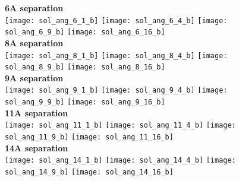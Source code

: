 \documentclass[journal=acsnano,manuscript=article]{achemso}
\begin{document}
\begin{figure}[h!]
	\centering
	\textbf{6A separation} \\
	\texttt{[image: sol\_ang\_6\_1\_b]}
	\texttt{[image: sol\_ang\_6\_4\_b]}
	\texttt{[image: sol\_ang\_6\_9\_b]}
	\texttt{[image: sol\_ang\_6\_16\_b]}
	\\ \textbf{8A separation} \\
	\texttt{[image: sol\_ang\_8\_1\_b]}
	\texttt{[image: sol\_ang\_8\_4\_b]}
	\texttt{[image: sol\_ang\_8\_9\_b]}
	\texttt{[image: sol\_ang\_8\_16\_b]}
	\\ \textbf{9A separation} \\
	\texttt{[image: sol\_ang\_9\_1\_b]}
	\texttt{[image: sol\_ang\_9\_4\_b]}
	\texttt{[image: sol\_ang\_9\_9\_b]}
	\texttt{[image: sol\_ang\_9\_16\_b]}
	\\ \textbf{11A separation} \\
	\texttt{[image: sol\_ang\_11\_1\_b]}
	\texttt{[image: sol\_ang\_11\_4\_b]}
	\texttt{[image: sol\_ang\_11\_9\_b]}
	\texttt{[image: sol\_ang\_11\_16\_b]}
	\\ \textbf{14A separation} \\
	\texttt{[image: sol\_ang\_14\_1\_b]}
	\texttt{[image: sol\_ang\_14\_4\_b]}
	\texttt{[image: sol\_ang\_14\_9\_b]}
	\texttt{[image: sol\_ang\_14\_16\_b]}
	\label{fig:ang_sol}
\end{figure}
\end{document}
